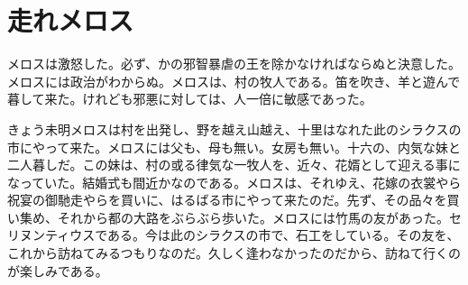 \documentclass[tate, book, paper=a5]{jlreq}
\begin{document}
\chapter*{走れメロス}

メロスは激怒した。必ず、かの邪智暴虐の王を除かなければならぬと決意した。メロスには政治がわからぬ。メロスは、村の牧人である。笛を吹き、羊と遊んで暮して来た。けれども邪悪に対しては、人一倍に敏感であった。

きょう未明メロスは村を出発し、野を越え山越え、十里はなれた此のシラクスの市にやって来た。メロスには父も、母も無い。女房も無い。十六の、内気な妹と二人暮しだ。この妹は、村の或る律気な一牧人を、近々、花婿として迎える事になっていた。結婚式も間近かなのである。メロスは、それゆえ、花嫁の衣裳やら祝宴の御馳走やらを買いに、はるばる市にやって来たのだ。先ず、その品々を買い集め、それから都の大路をぶらぶら歩いた。メロスには竹馬の友があった。セリヌンティウスである。今は此のシラクスの市で、石工をしている。その友を、これから訪ねてみるつもりなのだ。久しく逢わなかったのだから、訪ねて行くのが楽しみである。
\end{document}

